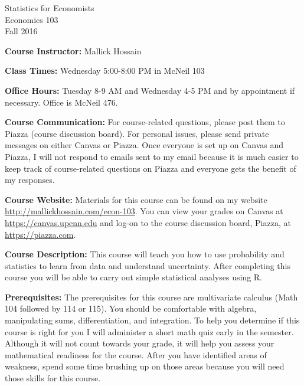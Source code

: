 \documentclass[11pt, letterpaper]{article}
\begin{document}
\thispagestyle{plain}

\begin{center}
\Large
\sc
Statistics for Economists\\
\large
Economics 103\\
\large
Fall 2016
\end{center}


\normalsize
\bigskip
\noindent \textbf{Course Instructor:} Mallick Hossain

\medskip

\noindent \textbf{Class Times:} Wednesday 5:00-8:00 PM in McNeil 103

\medskip

\noindent \textbf{Office Hours:} Tuesday 8-9 AM and Wednesday 4-5 PM and by appointment if necessary. Office is McNeil 476.

\medskip

\noindent \textbf{Course Communication:} 
For course-related questions, please post them to Piazza (course discussion board). 
For personal issues, please send private messages on either Canvas or Piazza. 
Once everyone is set up on Canvas and Piazza, I will not respond to emails sent to my email because it is much easier to keep track of course-related questions on Piazza and everyone gets the benefit of my responses. 

\medskip
 
\noindent \textbf{Course Website:} Materials for this course can be found on my website \url{http://mallickhossain.com/econ-103}. 
You can view your grades on Canvas at \url{https://canvas.upenn.edu} and log-on to the course discussion board, Piazza, at \url{https://piazza.com}.

\medskip

\noindent \textbf{Course Description:} 
This course will teach you how to use probability and statistics to learn from data and understand uncertainty. 
After completing this course you will be able to carry out simple statistical analyses using R.

\medskip

\noindent \textbf{Prerequisites:} 
The prerequisites for this course are multivariate calculus (Math 104 followed by 114 or 115). 
You should be comfortable with algebra, manipulating sums, differentiation, and integration. 
To help you determine if this course is right for you I will administer a short math quiz early in the semester. 
Although it will not count towards your grade, it will help you assess your mathematical readiness for the course. 
After you have identified areas of weakness, spend some time brushing up on those areas because you will need those skills for this course.
\end{document}
